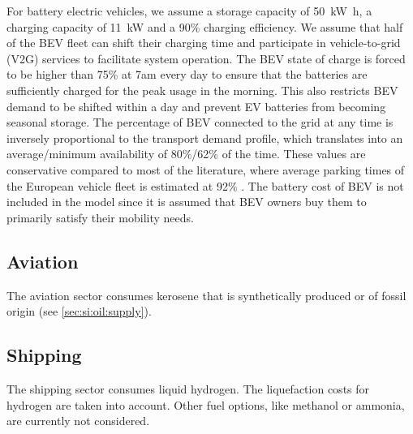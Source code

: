 For battery electric vehicles, we assume a storage capacity of
\SI{50}{\kilo\watt\hour}, a charging capacity of \SI{11}{\kilo\watt} and a 90\%
charging efficiency. We assume that half of the BEV fleet can shift their
charging time and participate in vehicle-to-grid (V2G) services to facilitate
system operation. The BEV state of charge is forced to be higher than 75\% at
7am every day to ensure that the batteries are sufficiently charged for the peak
usage in the morning. This also restricts BEV demand to be shifted within a day
and prevent EV batteries from becoming seasonal storage. The percentage of BEV
connected to the grid at any time is inversely proportional to the transport
demand profile, which translates into an average/minimum availability of
80\%/62\% of the time. These values are conservative compared to most of the
literature, where average parking times of the European vehicle fleet is
estimated at 92\% \citeS{}. The battery cost of BEV is not included in the model
since it is assumed that BEV owners buy them to primarily satisfy their mobility
needs.

\subsection{Aviation}
\label{sec:si:transport:aviation}

The aviation sector consumes kerosene that is synthetically produced or of
fossil origin (see \cref{sec:si:oil:supply}).

\subsection{Shipping}
\label{sec:si:transport:shipping}

The shipping sector consumes liquid hydrogen.
The liquefaction costs for hydrogen are taken into account.
Other fuel options, like methanol or ammonia, are currently not considered.